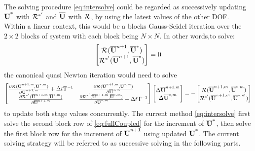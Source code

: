 \documentclass[preprint,12pt]{elsarticle}
\begin{document}
The solving procedure \eqref{eq:intersolve} could be regarded as
successively updating $\overline{\mathbf{U}}^*$ with $\mathcal{R}^{*'}$ and $\overline{\mathbf{U}}$
with $\mathcal{R}^{}$, by using the latest values of the other DOF.
Within a linear context,
this would be a blocks Gauss-Seidel iteration
over the $2\times2$ blocks of system with each block being $N\times N$.
In other words,to solve:
\begin{equation*}
    \begin{bmatrix}
        \mathcal{R}^{}(\overline{\mathbf{U}}^{n+1},\overline{\mathbf{U}}^{*}) \\
        \mathcal{R}^{*'}(\overline{\mathbf{U}}^{n+1},\overline{\mathbf{U}}^{*})
    \end{bmatrix} = 0
\end{equation*}
the canonical quasi Newton iteration would need to solve
\begin{equation}
    \label{eq:fullCoupled}
    \begin{bmatrix}
        \frac{\partial\mathcal{R}^{}(\overline{\mathbf{U}}^{n+1,m},\overline{\mathbf{U}}^{*,m})}{\partial\overline{\mathbf{U}}^{n+1,m}} + \mathrm\Delta t\mathrm{T}^{-1} &
        \frac{\partial\mathcal{R}^{}(\overline{\mathbf{U}}^{n+1,m},\overline{\mathbf{U}}^{*,m})}{\partial\overline{\mathbf{U}}^{*,m}}                       \\
        \frac{\partial\mathcal{R}^{*'}(\overline{\mathbf{U}}^{n+1,m},\overline{\mathbf{U}}^{*,m})}{\partial\overline{\mathbf{U}}^{n+1,m}}                 &
        \frac{\partial\mathcal{R}^{*'}(\overline{\mathbf{U}}^{n+1,m},\overline{\mathbf{U}}^{*,m})}{\partial\overline{\mathbf{U}}^{*,m}} + \mathrm\Delta t\mathrm{T}^{-1}   \\
    \end{bmatrix}
    \begin{bmatrix}
        \mathrm\Delta\overline{\mathbf{U}}^{n+1,m} \\
        \mathrm\Delta\overline{\mathbf{U}}^{*,m}
    \end{bmatrix}
    =
    -\begin{bmatrix}
        \mathcal{R}^{}(\overline{\mathbf{U}}^{n+1,m},\overline{\mathbf{U}}^{*,m}) \\
        \mathcal{R}^{*'}(\overline{\mathbf{U}}^{n+1,m},\overline{\mathbf{U}}^{*,m})
    \end{bmatrix}
\end{equation}
to update both stage values concurrently.
The current method \eqref{eq:intersolve}
first solve the second block row of
\eqref{eq:fullCoupled} for the increment of $\overline{\mathbf{U}}^*$,
then solve the first block row
for the increment of $\overline{\mathbf{U}}^{n+1}$ using updated $\overline{\mathbf{U}}^*$.
The current solving strategy will
be referred to as successive solving in the following parts.
\end{document}
